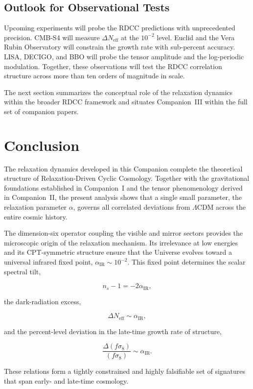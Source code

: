 \documentclass[11pt,a4paper]{article}
\begin{document}
\subsection{Outlook for Observational Tests}

Upcoming experiments will probe the RDCC predictions with unprecedented precision.
CMB-S4 will measure $\Delta N_{\mathrm{eff}}$ at the $10^{-2}$ level. Euclid and the Vera Rubin
Observatory will constrain the growth rate with sub-percent accuracy. LISA, DECIGO,
and BBO will probe the tensor amplitude and the log-periodic modulation. Together,
these observations will test the RDCC correlation structure across more than ten orders
of magnitude in scale.

The next section summarizes the conceptual role of the relaxation dynamics within the
broader RDCC framework and situates Companion~III within the full set of companion
papers.

\section{Conclusion}

The relaxation dynamics developed in this Companion complete the theoretical structure
of Relaxation-Driven Cyclic Cosmology. Together with the gravitational foundations
established in Companion~I and the tensor phenomenology derived in Companion~II,
the present analysis shows that a single small parameter, the relaxation parameter
$\alpha$, governs all correlated deviations from $\Lambda$CDM across the entire cosmic
history.

The dimension-six operator coupling the visible and mirror sectors provides the
microscopic origin of the relaxation mechanism. Its irrelevance at low energies and its
CPT-symmetric structure ensure that the Universe evolves toward a universal infrared
fixed point, $\alpha_{\mathrm{IR}} \sim 10^{-2}$. This fixed point determines the scalar spectral
tilt,


\[
    n_s - 1 = -2\alpha_{\mathrm{IR}},
\]


the dark-radiation excess,


\[
    \Delta N_{\mathrm{eff}} \sim \alpha_{\mathrm{IR}},
\]


and the percent-level deviation in the late-time growth rate of structure,


\[
    \frac{\Delta(f\sigma_8)}{(f\sigma_8)} \sim \alpha_{\mathrm{IR}}.
\]


These relations form a tightly constrained and highly falsifiable set of signatures that
span early- and late-time cosmology.
\end{document}
